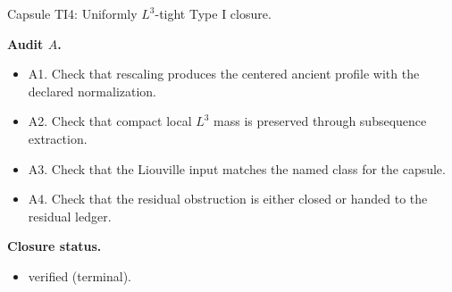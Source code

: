 \documentclass[11pt]{amsart}
\newcommand{\capsulefield}[1]{\par\smallskip\noindent\textbf{#1.}\ }
\begin{document}
\begin{proofcapsule}{Capsule TI4: Uniformly $L^3$-tight Type I closure.}
  \capsulefield{Audit \(A\)}
  \begin{itemize}[leftmargin=1.8em]
  \item A1. Check that rescaling produces the centered ancient profile with the declared normalization.
  \item A2. Check that compact local $L^3$ mass is preserved through subsequence extraction.
  \item A3. Check that the Liouville input matches the named class for the capsule.
  \item A4. Check that the residual obstruction is either closed or handed to the residual ledger.
  \end{itemize}
  \capsulefield{Closure status}
  \begin{itemize}[leftmargin=1.8em]
  \item verified (terminal).
  \end{itemize}
\end{proofcapsule}
\end{document}
